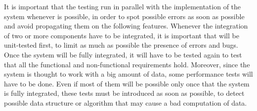 \documentclass[../RASD.tex]{subfiles}
\begin{document}
    It is important that the testing run in parallel with the implementation of the system whenever is possible, in order to spot possible errors
    as soon as possible and avoid propagating them on the following features.
    Whenever the integration of two or more components have to be integrated,
    it is important that will be unit-tested first, to limit as much as possible the presence of errors and bugs.
    Once the system will be fully integrated, it will have to be tested again to test that all the functional and non-functional requirements hold.
    Moreover, since the system is thought to work with a big amount of data, some performance tests will have to be done.
    Even if most of them will be possible only once that the system is fully integrated, these tests must be introduced as soon as possible,
    to detect possible data structure or algorithm that may cause a bad computation of data.
    \newpage
\end{document}
